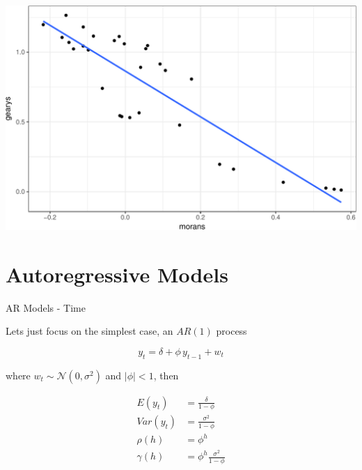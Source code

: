 \documentclass[11pt,ignorenonframetext,]{beamer}
\begin{document}
\begin{frame}{}
\protect\hypertarget{section-1}{}

\begin{center}\includegraphics[width=\textwidth]{Lec17_files/figure-beamer/unnamed-chunk-6-1} \end{center}

\end{frame}

\hypertarget{autoregressive-models}{%
\section{Autoregressive Models}\label{autoregressive-models}}

\begin{frame}[t]{AR Models - Time}
\protect\hypertarget{ar-models---time}{}

Lets just focus on the simplest case, an \(AR(1)\) process

\[ y_t = \delta + \phi \, y_{t-1} + w_t \]

where \(w_t \sim \mathcal{N}(0,\sigma^2)\) and \(|\phi| < 1\), then

\[
\begin{aligned}
E(y_t) &= \frac{\delta}{1-\phi} \\
Var(y_t) &= \frac{\sigma^2}{1-\phi} \\
\rho(h) &= \phi^{h} \\
\gamma(h) &=  \phi^h \frac{\sigma^2}{1-\phi}
\end{aligned}
\]

\end{frame}
\end{document}
